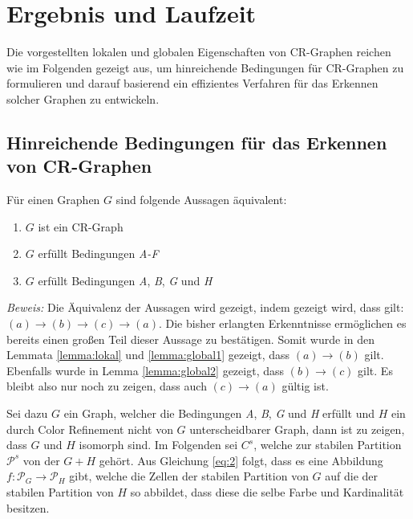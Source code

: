 \section{Ergebnis und Laufzeit}
\label{sec/ergebnis}


Die vorgestellten lokalen und globalen Eigenschaften von CR-Graphen reichen wie im Folgenden gezeigt aus, um hinreichende Bedingungen für CR-Graphen zu formulieren und darauf basierend ein effizientes Verfahren für das Erkennen solcher Graphen zu entwickeln.

\subsection{Hinreichende Bedingungen für das Erkennen von CR-Graphen}
\begin{Theorem}
	Für einen Graphen $G$ sind folgende Aussagen äquivalent:
	
	\begin{enumerate}[label=(\alph*)]
		\item $G$ ist ein CR-Graph
		\item $G$ erfüllt Bedingungen \emph{A-F}
		\item $G$ erfüllt Bedingungen \emph{A}, \emph{B}, \emph{G} und \emph{H}
	\end{enumerate}
\end{Theorem}

\emph{Beweis:} Die Äquivalenz der Aussagen wird gezeigt, indem gezeigt wird, dass gilt: $(a)\rightarrow (b)\rightarrow (c)\rightarrow (a)$.
Die bisher erlangten Erkenntnisse ermöglichen es bereits einen großen Teil dieser Aussage zu bestätigen. Somit wurde in den Lemmata \ref{lemma:lokal} und \ref{lemma:global1} gezeigt, dass $(a)\rightarrow (b)$ gilt. Ebenfalls wurde in Lemma \ref{lemma:global2} gezeigt, dass $(b)\rightarrow (c)$ gilt. Es bleibt also nur noch zu zeigen, dass auch $(c)\rightarrow (a)$ gültig ist.

Sei dazu $G$ ein Graph, welcher die Bedingungen \emph{A}, \emph{B}, \emph{G} und \emph{H} erfüllt und $H$ ein durch Color Refinement nicht von $G$ unterscheidbarer Graph, dann ist zu zeigen, dass $G$ und $H$ isomorph sind.
Im Folgenden sei $C^s$, welche zur stabilen Partition $\mathcal{P}^s$ von der  $G+H$ gehört.
Aus Gleichung \ref{eq:2} folgt, dass es eine Abbildung $f:\mathcal{P}_G\rightarrow \mathcal{P}_H$ gibt, welche die Zellen der stabilen Partition von $G$ auf die der stabilen Partition von $H$ so abbildet, dass diese die selbe Farbe und Kardinalität besitzen.

